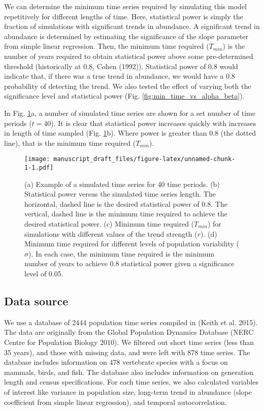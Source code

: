 \documentclass[12pt,]{article}
\begin{document}
We can determine the minimum time series required by simulating this
model repetitively for different lengths of time. Here, statistical
power is simply the fraction of simulations with significant trends in
abundance. A significant trend in abundance is determined by estimating
the significance of the slope parameter from simple linear regression.
Then, the minimum time required (\(T_{min}\)) is the number of years
required to obtain statistical power above some pre-determined threshold
(historically at 0.8, Cohen (1992)). Statistical power of 0.8 would
indicate that, if there was a true trend in abundance, we would have a
0.8 probability of detecting the trend. We also tested the effect of
varying both the significance level and statistical power (Fig.
\ref{fig:min_time_vs_alpha_beta}).

In Fig. \ref{fig:theoretical_approach}a, a number of simulated time
series are shown for a set number of time periods (\(t=40\)). It is
clear that statistical power increases quickly with increases in length
of time sampled (Fig. \ref{fig:theoretical_approach}b). Where power is
greater than 0.8 (the dotted line), that is the minimum time required
(\(T_{min}\)).

\begin{figure}[htbp]
\centering
\texttt{[image: manuscript\_draft\_files/figure-latex/unnamed-chunk-1-1.pdf]}
\caption{(a) Example of a simulated time series for 40 time periods. (b)
Statistical power versus the simulated time series length. The
horizontal, dashed line is the desired statistical power of 0.8. The
vertical, dashed line is the minimum time required to achieve the
desired statistical power. (c) Minimum time required (\(T_{min}\)) for
simulations with different values of the trend strength (\(r\)). (d)
Minimum time required for different levels of population variability
(\(\sigma\)). In each case, the minimum time required is the minimum
number of years to achieve 0.8 statistical power given a significance
level of 0.05.\label{fig:theoretical_approach}}
\end{figure}

\subsection{Data source}\label{data-source}

We use a database of 2444 population time series compiled in (Keith et
al. 2015). The data are originally from the Global Population Dynamics
Database (NERC Centre for Population Biology 2010). We filtered out
short time series (less than 35 years), and those with missing data, and
were left with 878 time series. The database includes information on 478
vertebrate species with a focus on mammals, birds, and fish. The
database also includes information on generation length and census
specifications. For each time series, we also calculated variables of
interest like variance in population size, long-term trend in abundance
(slope coefficient from simple linear regression), and temporal
autocorrelation.
\end{document}
